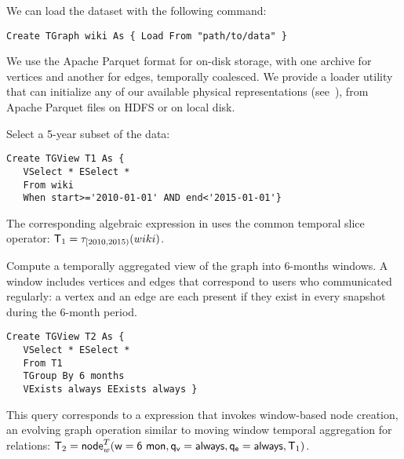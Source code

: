 
\begin{example}
\label{ex:load}

We can load the dataset with the following command:

\begin{small} 
\begin{verbatim}
Create TGraph wiki As { Load From "path/to/data" }
\end{verbatim}
\end{small}

\end{example}

We use the Apache Parquet format for on-disk storage, with one archive
for vertices and another for edges, temporally coalesced.  We provide
a loader utility that can initialize any of our available physical
representations (see~\cite{PortalarXiv2016}), from Apache Parquet
files on HDFS or on local disk.

\begin{example}
\label{ex:slice}

Select a 5-year subset of the data:

\begin{small} 
\begin{verbatim}
Create TGView T1 As { 
   VSelect * ESelect *
   From wiki
   When start>='2010-01-01' AND end<'2015-01-01'}
\end{verbatim}
\end{small}

The corresponding algebraic expression in \tra uses the common
temporal slice operator: $\mathsf{T}_1 = \tau_{[2010,2015)}(wiki)$.

\end{example}

\begin{example}
\label{ex:nodecrt}

Compute a temporally aggregated view of the graph into 6-months
windows.  A window includes vertices and edges that correspond to
users who communicated regularly: a vertex and an edge are each
present if they exist in every snapshot during the 6-month period.

\begin{small} 
\begin{verbatim}
Create TGView T2 As { 
   VSelect * ESelect *
   From T1
   TGroup By 6 months
   VExists always EExists always }
\end{verbatim}
\end{small}

This query corresponds to a \tra expression that invokes window-based
node creation, an evolving graph operation similar to moving window
temporal aggregation for relations:
$\mathsf{T}_2 = \textsf{node}^T_w(\mathsf{w=6~mon},\mathsf{q_v=always},\mathsf{q_e=always},\mathsf{T}_1)$.

\end{example}


